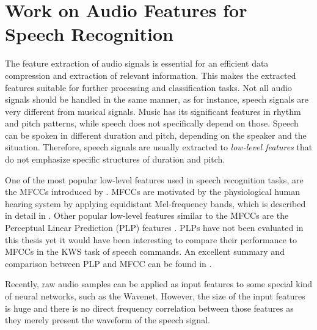 
\section{Work on Audio Features for Speech Recognition}\label{sec:prev_features}
The feature extraction of audio signals is essential for an efficient data compression and extraction of relevant information.
This makes the extracted features suitable for further processing and classification tasks.
Not all audio signals should be handled in the same manner, as for instance, speech signals are very different from musical signals.
Music has its significant features in rhythm and pitch patterns, while speech does not specifically depend on those.
Speech can be spoken in different duration and pitch, depending on the speaker and the situation.
Therefore, speech signals are usually extracted to \emph{low-level features} that do not emphasize specific structures of duration and pitch.

One of the most popular low-level features used in speech recognition tasks, are the MFCCs introduced by \cite{Davis1980MFCC}.
MFCCs are motivated by the physiological human hearing system by applying equidistant Mel-frequency bands, which is described in detail in .
Other popular low-level features similar to the MFCCs are the Perceptual Linear Prediction (PLP) features \cite{Hermansky1987}.
PLPs have not been evaluated in this thesis yet it would have been interesting to compare their performance to MFCCs in the KWS task of speech commands.
An excellent summary and comparison between PLP and MFCC can be found in \cite{Hoenig2005}.

Recently, raw audio samples can be applied as input features to some special kind of neural networks, such as the Wavenet. 
However, the size of the input features is huge and there is no direct frequency correlation between those features as they merely present the waveform of the speech signal.
